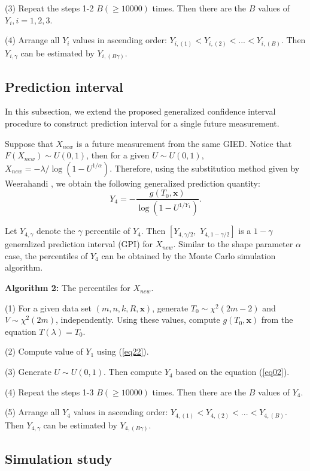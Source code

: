 \documentclass[12pt]{article}
\begin{document}
(3) Repeat the steps 1-2 $B(\ge 10000)$ times. Then there are the $B$ values of $Y_i, i=1,2,3$.

(4) Arrange all $Y_i$ values in ascending order: $Y_{i,(1)}<Y_{i,(2)}<...<Y_{i,(B)}$. Then $Y_{i, \gamma}$ can be estimated by $Y_{i, (B\gamma)}$.

\subsection{Prediction interval}

In this subsection, we extend the proposed generalized confidence interval procedure to construct prediction interval for a single
future measurement.

Suppose that $X_{new}$ is a future measurement from the same GIED. Notice that $F(X_{new})\sim U(0,1)$, then for a given $U\sim U(0, 1)$, $X_{new}=-\lambda/\log(1-U^{1/\alpha})$. Therefore, using the substitution method given by Weerahandi \cite{weerahandi2004generalized}, we obtain the following generalized prediction quantity:
\begin{equation}\label{eq02}
Y_4=-\frac{g(T_0,\textbf{x})}{\log(1-U^{1/Y_1})}.
\end{equation}


Let $Y_{4,\gamma}$ denote the $\gamma$ percentile of $Y_4$. Then $[Y_{4,\gamma/2},\,\,Y_{4,1-\gamma/2}]$ is a $1-\gamma$ generalized prediction
interval (GPI) for $X_{new}$. Similar to the shape parameter $\alpha$ case, the percentiles of $Y_4$ can be obtained by the Monte Carlo simulation
algorithm.

{\bf Algorithm 2:} The percentiles for $X_{new}$.

(1) For a given data set $(m, n, k, R, \textbf{x})$, generate $T_0 \sim \chi^2(2m-2)$ and $ V
\sim \chi^2(2m)$, independently. Using these values, compute $g(T_0,\textbf{x})$ from the equation $T(\lambda)=T_0$.

(2) Compute value of $Y_1$ using (\ref{eq22}).

(3) Generate $U\sim U(0,1)$. Then compute $Y_4$ based on the equation (\ref{eq02}).

(4) Repeat the steps 1-3 $B(\ge 10000)$ times. Then there are the $B$ values of $Y_4$.

(5) Arrange all $Y_4$ values in ascending order: $Y_{4,(1)}<Y_{4,(2)}<...<Y_{4,(B)}$. Then $Y_{4, \gamma}$ can be estimated by $Y_{4, (B\gamma)}$.


\subsection{Simulation study}
\end{document}
